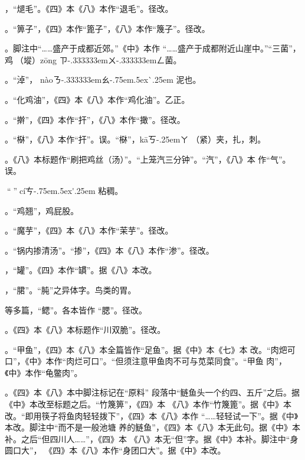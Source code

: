 ，“煺毛”。《四》本《八》本作“退毛”。径改。

。“箅子”，《四》本作“篦子”，《八》本作“篾子”。径改。

。脚注{\footnotesize{}}中“……盛产于成都近郊。”《中》本作
“……盛产于成都附近山崖中。”“三菌”，鸡𭎂（㙡）{z\={o}ng}%
{ㄗ\kern-.333333emㄨ\kern-.333333emㄥ}菌。

。“淖”，
{n\`{a}o}{ㄋ\kern-.333333emㄠ\kern-.75em\raise.5ex\hbox{\`{}}\kern.25em} 泥也。

。“化鸡油”，《四》本《八》本作“鸡化油”。乙正。

。“擀”，《四》本作“扞”，《八》本作“撖”。径改。

。“㮟”，《八》本作“扞”。误。“㮟”，{k\={a}}{ㄎ\kern-.25emㄚ}
（紧）夹，扎，刺。

。《八》本标题作“刷把鸡丝（汤）”。“上笼汽三分钟”。“汽”，《八》本
作“气”。误。

。“𫃕”，{c\'{i}}{ㄘ\kern-.75em\raise.5ex\hbox{\'{}}\kern.25em}
粘稠。

。“鸡翘”，鸡屁股。

。“魔芋”，《四》本《八》本作“茉芋”。径改。

。“锅内掺清汤”。“掺”，《四》本《八》本作“渗”。径改。

，“罐”。《四》本作“罆”。据《八》本改。

，“𬂁”。“肫”之异体字。鸟类的胃。

等多篇，“鳃”。各本皆作
“腮”。径改。

。《四》本《八》本标题作“川双脆”。径改。

。“甲鱼”，《四》本《八》本全篇皆作“足鱼”。据《中》本《七》本
改。“肉𤆵可口”，《中》本作“肉烂可口”。“但须注意甲鱼肉不可与苋菜同食”。“甲鱼
肉”，《中》本作“龟鳖肉”。

。《四》本《八》本中脚注标记{\footnotesize{}}在“原料”
段落中“鲢鱼头一个约四、五斤”之后。据《中》本改至标题之后。“竹篾箅”，《四》本
《八》本作“竹篾篦”。据《中》本改。“即用筷子将鱼肉轻轻拨下”，《四》本《八》本作
“……轻轻试一下”。据《中》本改。脚注{\footnotesize{}}中“而不是一般池塘
养的鲢鱼”，《四》本《八》本无此句。据《中》本补。之后“但四川人……”，《四》本
《八》本无“但”字。据《中》本补。脚注{\footnotesize{}}中“身圆口大”，
《四》本《八》本作“身团口大”。据《中》本改。

